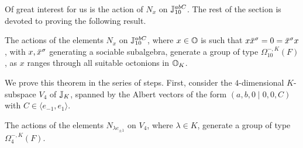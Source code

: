 Of great interest for us is the action of $N_x$ on $\mathbb{J}_{10}^{abC}$. The rest of the section
is devoted to proving the following result.

\begin{theorem}
	\label{theorem:3_nx_omega}
	The actions of the elements $N_x$ on $\mathbb{J}_{10}^{abC}$, where $x \in \mathbb{O}$ is such that 
	\mbox{$x \ovx^{\s} = 0 = \ovx^{\s} x$}, with $x,\mathord{\mbox{\hspace*{0pt}}\,\overline{\!x\!\!\;}\!\:}\mbox{\hspace*{0pt}}^{\sigma}$ generating a sociable subalgebra, 
	generate a group of type $\Omega_{10}^{-,K}(F)$, as $x$ ranges through all suitable octonions
	in $\mathbb{O}_K$.  
\end{theorem}

We prove this theorem in the series of steps. First, consider the $4$-dimensional 
$K$-subspace $V_4$ of $\mathbb{J}_K$, 
spanned by the Albert vectors of the form $(a,b,0\mid 0,0,C)$ with 
$C \in \langle e_{-1}, e_{1} \rangle$. 

\begin{lemma}
	The actions of the elements $N_{\lambda e_{ \pm 1 }}$ on $V_4$, where $\lambda \in K$, 
	generate a group of type $\Omega_4^{-,K}(F)$. 
\end{lemma}

